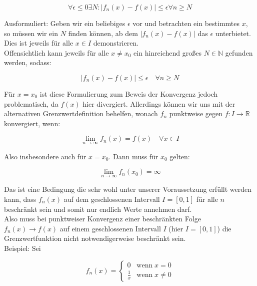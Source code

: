 \documentclass[a4paper,german,12pt,smallheadings]{scrartcl}
\begin{document}
\begin{equation*}
\forall \epsilon \le 0 \exists N: |f_n(x)-f(x)| \le \epsilon \forall n \geq N
\end{equation*}

Ausformuliert: Geben wir ein beliebiges $\epsilon$ vor und betrachten ein bestimmtes $x$, so müssen wir ein $N$ finden können, ab dem $|f_n(x)-f(x)|$ das $\epsilon$ unterbietet. Dies ist jeweils für alle $x \in I$ demonstrieren.\\

Offensichtlich kann jeweils für alle $x \neq x_0$ ein hinreichend großes $N \in \mathbb{N}$ gefunden werden, sodass:

\begin{equation*}
|f_n(x)-f(x)| \le \epsilon \quad \forall n \ge N
\end{equation*}

Für $x=x_0$ ist diese Formulierung zum Beweis der Konvergenz jedoch problematisch, da $f(x)$ hier divergiert. Allerdings können wir uns mit der alternativen Grenzwertdefinition behelfen, wonach $f_n$ punktweise gegen $f:I \rightarrow \mathbb{R}$ konvergiert, wenn:

\begin{equation*}
\lim\limits_{n \to \infty}f_n(x)=f(x) \quad \forall x \in I
\end{equation*} 

Also insbesondere auch für $x=x_0$. Dann muss für $x_0$ gelten:

\begin{equation*}
\lim\limits_{n \to \infty}f_n(x_0) = \infty
\end{equation*}

Das ist eine Bedingung die sehr wohl unter unserer Voraussetzung erfüllt werden kann, dass $f_n(x)$ auf dem geschlossenen Intervall $I=[0,1]$ für alle $n$ beschränkt sein und somit nur endlich Werte annehmen darf.\\

Also muss bei punktweiser Konvergenz einer beschränkten Folge $f_n(x) \rightarrow f(x)$ auf einem geschlossenen Intervall $I$ (hier $I=[0,1]$) die Grenzwertfunktion nicht notwendigerweise beschränkt sein.\\

Beispiel: Sei

\begin{equation*}
  f_n(x) = \begin{cases}
    0 & \mbox{wenn} \; x = 0 \\
    \frac{1}{x} & \mbox{wenn} \; x \neq 0
  \end{cases}
\end{equation*}
\end{document}
